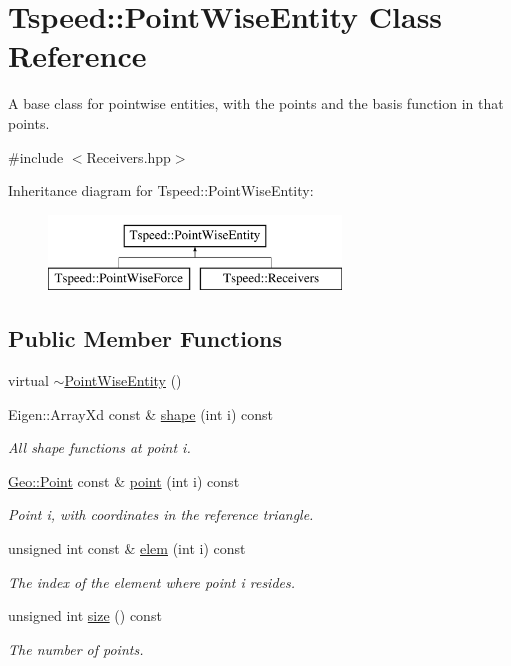 \hypertarget{classTspeed_1_1PointWiseEntity}{\section{Tspeed\-:\-:Point\-Wise\-Entity Class Reference}
\label{classTspeed_1_1PointWiseEntity}
}


A base class for pointwise entities, with the points and the basis function in that points.  




{\ttfamily \#include $<$Receivers.\-hpp$>$}

Inheritance diagram for Tspeed\-:\-:Point\-Wise\-Entity\-:\begin{figure}[H]
\begin{center}
\leavevmode
\includegraphics[height=2.000000cm]{classTspeed_1_1PointWiseEntity}
\end{center}
\end{figure}
\subsection*{Public Member Functions}
\begin{DoxyCompactItemize}
\item 
virtual \hyperlink{classTspeed_1_1PointWiseEntity_a602393b4fd96ffd3d40ea3ff30cdc366}{$\sim$\-Point\-Wise\-Entity} ()
\item 
Eigen\-::\-Array\-Xd const \& \hyperlink{classTspeed_1_1PointWiseEntity_a9369e650140e66a58e902ee752cf36ca}{shape} (int i) const 
\begin{DoxyCompactList}\small\item\em All shape functions at point i. \end{DoxyCompactList}\item 
\hyperlink{classTspeed_1_1Geo_1_1Point}{Geo\-::\-Point} const \& \hyperlink{classTspeed_1_1PointWiseEntity_a4a71d4b7bfa160b2aaa6d3d2a4c35713}{point} (int i) const 
\begin{DoxyCompactList}\small\item\em Point i, with coordinates in the reference triangle. \end{DoxyCompactList}\item 
unsigned int const \& \hyperlink{classTspeed_1_1PointWiseEntity_ac1271c51d7dd8689a38a60ca858e160f}{elem} (int i) const 
\begin{DoxyCompactList}\small\item\em The index of the element where point i resides. \end{DoxyCompactList}\item 
unsigned int \hyperlink{classTspeed_1_1PointWiseEntity_aea02312bcb1b3c20a465e2d696b65924}{size} () const 
\begin{DoxyCompactList}\small\item\em The number of points. \end{DoxyCompactList}\end{DoxyCompactItemize}
